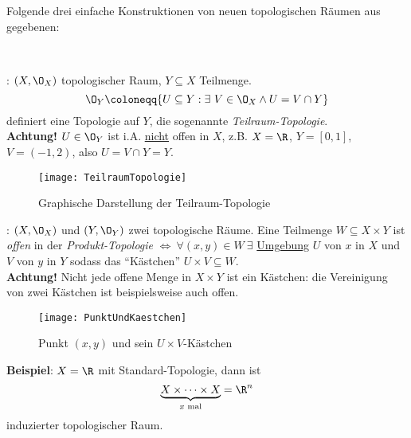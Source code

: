 \begin{remark}
  Folgende drei einfache Konstruktionen von neuen topologischen Räumen aus gegebenen:
  \begin{enumerate}
    \  \\
    \begin{minipage}{.45\textwidth}
      \item {}\label{def:teilraumtopologie}: \( (X, \O_X) \) topologischer Raum, \( Y \subseteq X \) Teilmenge.
        \begin{equation*}
          \O_Y \coloneqq \{ U \subseteq Y : \exists \ V \in \O_X \wedge U = V \cap Y \}
        \end{equation*}
        definiert eine Topologie auf \( Y \), die sogenannte \emph{Teilraum-Topologie}.\footnotemark{} \\
        \textbf{Achtung!} \( U \in \O_Y \) ist i.A. \underline{nicht} offen in \( X \), z.B. \( X = \R \), \( Y = [0,1] \), \( V = (-1, 2) \), also \( U = V \cap Y = Y \).
    \end{minipage}
    \hfill
    \begin{minipage}{.45\textwidth}
      \begin{figure}[H]
        \texttt{[image: TeilraumTopologie]}
        \caption{Graphische Darstellung der Teilraum-Topologie}
      \end{figure}
    \end{minipage}

    \begin{minipage}{.45\textwidth}
      \item {}\label{def:produkttopologie}: \( (X, \O_X) \) und \( (Y, \O_Y) \) zwei topologische Räume. Eine Teilmenge \( W \subseteq X \times Y \) ist \emph{offen} in der \emph{Produkt-Topologie} \( \Leftrightarrow \ \forall (x, y) \in W \ \exists \) \hyperref[def:umgebung]{Umgebung} \( U \) von \( x \) in \( X \) und \( V \) von \( y \) in \( Y \) sodass das ``Kästchen'' \( U \times V \subseteq W \). \\
      \textbf{Achtung!} Nicht jede offene Menge in \( X \times Y \) ist ein Kästchen: die Vereinigung von zwei Kästchen ist beispielsweise auch offen.
    \end{minipage}
    \hfill
    \begin{minipage}{.45\textwidth}
      \begin{figure}[H]
        \texttt{[image: PunktUndKaestchen]}
        \caption{Punkt \( (x,y) \) und sein \( U \times V \)-Kästchen}
      \end{figure}
    \end{minipage}
    \textbf{Beispiel}: \( X = \R \) mit Standard-Topologie, dann ist
    \begin{equation*}
      \underbrace{X \times \cdots \times X}_{x \text{ mal}} = \R^n
    \end{equation*}
    induzierter topologischer Raum.


\end{enumerate}
\end{remark}

